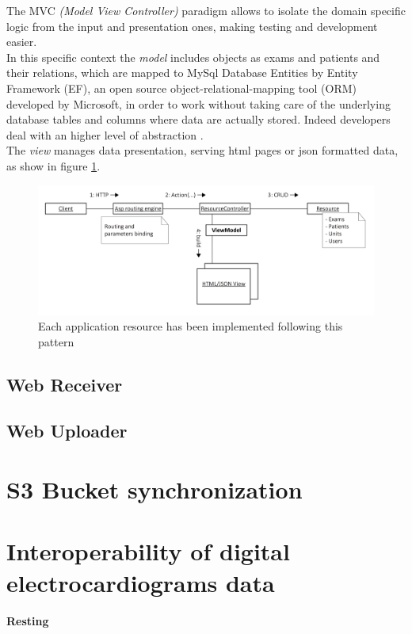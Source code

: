 The MVC \textit{(Model View Controller)} paradigm allows to isolate the domain specific logic from the input and presentation ones, making testing and development easier. \cite{mvc}\\
In this specific context the \textit{model} includes objects as exams and patients and their relations, which are mapped to MySql Database Entities by Entity Framework (EF), an open source object-relational-mapping tool (ORM) developed by Microsoft, in order to work without taking care of the underlying database tables and columns where data are actually stored. Indeed developers deal with an higher level of abstraction \cite{wikipedia_ef}.\\
The \textit{view} manages data presentation, serving html pages or json formatted data, as show in figure \ref{fig:app_resource_pattern}.\\
\begin{figure}[h]
    \includegraphics[width=\textwidth]{img/app_resource_pattern}
    \caption{Each application resource has been implemented following this pattern}
    \label{fig:app_resource_pattern}
\end{figure}

\subsection{Web Receiver}
\label{subsection:webreceiver}
\subsection{Web Uploader}
\section{S3 Bucket synchronization}
\section{Interoperability of digital electrocardiograms data}
\paragraph{Resting}
\label{paragraph:Resting}
